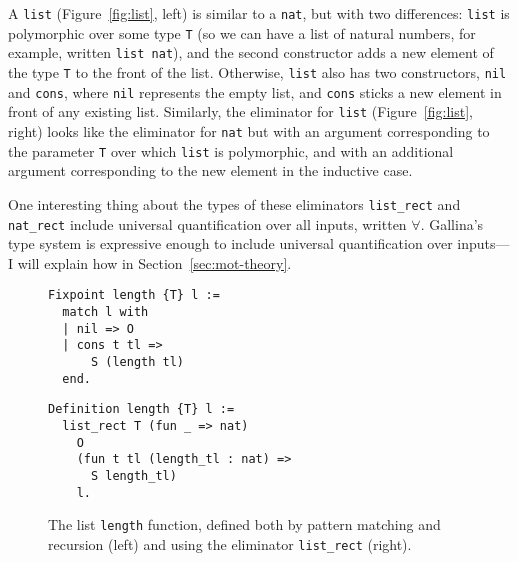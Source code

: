 A \lstinline{list} (Figure~\ref{fig:list}, left) is similar to a \lstinline{nat}, 
but with two differences: \lstinline{list} is polymorphic over some type \lstinline{T} (so we can have a list of natural numbers,
for example, written \lstinline{list nat}), and the second constructor adds a new element of the type \lstinline{T} to the front of the list.
Otherwise, \lstinline{list} also has two constructors, \lstinline{nil} and \lstinline{cons}, where \lstinline{nil} represents the empty list,
and \lstinline{cons} sticks a new element in front of any existing list.
Similarly, the eliminator for \lstinline{list} (Figure~\ref{fig:list}, right) looks like the eliminator for \lstinline{nat} 
but with an argument corresponding to the parameter \lstinline{T} over which \lstinline{list} is polymorphic,
and with an additional argument corresponding to the new element in the inductive case.

One interesting thing about the types of these eliminators \lstinline{list_rect} and \lstinline{nat_rect}
include universal quantification over all inputs, written $\forall$.
Gallina's type system is expressive enough to include universal quantification over inputs---I will explain how
in Section~\ref{sec:mot-theory}.

\begin{figure}
\begin{minipage}{0.42\textwidth}
\begin{lstlisting}
Fixpoint length {T} l :=
  match l with
  | nil => O
  | cons t tl =>
      S (length tl)
  end.
\end{lstlisting}
\end{minipage}
\hfill
\begin{minipage}{0.54\textwidth}
\begin{lstlisting}
Definition length {T} l :=
  list_rect T (fun _ => nat)
    O
    (fun t tl (length_tl : nat) =>
      S length_tl)
    l.
\end{lstlisting}
\end{minipage}
\caption{The list \lstinline{length} function, defined both by pattern matching and recursion (left) and using the eliminator \lstinline{list_rect} (right).}
\label{fig:length}
\end{figure}

